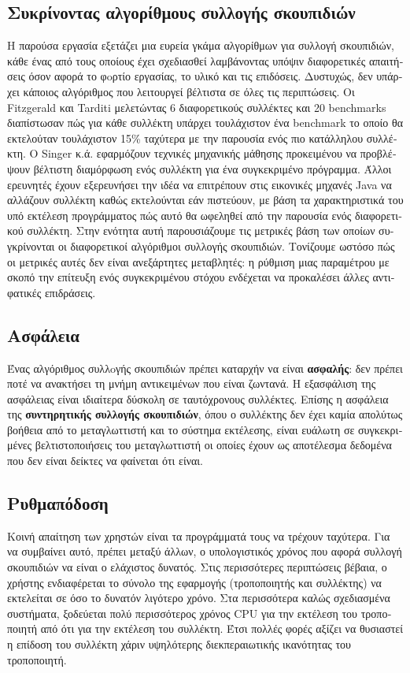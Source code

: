 \begin{greek}
\section{Συκρίνοντας αλγορίθμους συλλογής σκουπιδιών}
Η παρούσα εργασία εξετάζει μια ευρεία γκάμα αλγορίθμων για συλλογή
σκουπιδιών, κάθε ένας από τους οποίους έχει σχεδιασθεί λαμβάνοντας
υπόψιν διαφορετικές απαιτήσεις όσον αφορά το φoρτίο εργασίας,
το υλικό και τις επιδόσεις. Δυστυχώς, δεν υπάρχει κάποιος αλγόριθμος
που λειτουργεί βέλτιστα σε όλες τις περιπτώσεις. Οι Fitzgerald
και Tarditi \cite{DBLP:conf/iwmm/FitzgeraldT00} μελετώντας 6 
διαφορετικούς συλλέκτες και 20 benchmarks διαπίστωσαν πώς για
κάθε συλλέκτη υπάρχει τουλάχιστον ένα benchmark το οποίο θα εκτελούταν
τουλάχιστον 15\% ταχύτερα με την παρουσία ενός πιο κατάλληλου
συλλέκτη. Ο Singer κ.ά. \cite{DBLP:conf/iwmm/SingerBWC07} εφαρμόζουν
τεχνικές μηχανικής μάθησης προκειμένου να προβλέψουν βέλτιστη
διαμόρφωση ενός συλλέκτη για ένα συγκεκριμένο πρόγραμμα. Άλλοι
ερευνητές \cite{DBLP:conf/jvm/Printezis01,DBLP:conf/iwmm/SomanKB04}
έχουν εξερευνήσει την ιδέα να επιτρέπουν στις εικονικές μηχανές
Java να αλλάζουν συλλέκτη καθώς εκτελούνται εάν πιστεύουν, με
βάση τα χαρακτηριστικά του υπό εκτέλεση προγράμματος πώς αυτό
θα ωφεληθεί από την παρουσία ενός διαφορετικού συλλέκτη. Στην
ενότητα αυτή παρουσιάζουμε τις μετρικές βάση των οποίων συγκρίνονται
οι διαφορετικοί αλγόριθμοι συλλογής σκουπιδιών. Τονίζουμε ωστόσο
πώς οι μετρικές αυτές δεν είναι ανεξάρτητες μεταβλητές: η ρύθμιση
μιας παραμέτρου με σκοπό την επίτευξη ενός συγκεκριμένου στόχου
ενδέχεται να προκαλέσει άλλες αντιφατικές επιδράσεις.

\subsection{Ασφάλεια}
Ένας αλγόριθμος συλλoγής σκουπιδιών πρέπει καταρχήν να είναι
\textbf{ασφαλής}: δεν πρέπει ποτέ να ανακτήσει τη μνήμη αντικειμένων
που είναι ζωντανά. Η εξασφάλιση της ασφάλειας είναι ιδιαίτερα
δύσκολη σε ταυτόχρονους συλλέκτες. Επίσης η ασφάλεια της
\textbf{συντηρητικής συλλογής σκουπιδιών}, όπου ο συλλέκτης δεν
έχει καμία απολύτως βοήθεια από το μεταγλωττιστή και το σύστημα
εκτέλεσης, είναι ευάλωτη σε συγκεκριμένες βελτιστοποιήσεις του
μεταγλωττιστή οι οποίες έχουν ως αποτέλεσμα δεδομένα που
δεν είναι δείκτες να φαίνεται ότι είναι.

\subsection{Ρυθμαπόδοση}
Κοινή απαίτηση των χρηστών είναι τα προγράμματά τους να τρέχουν
ταχύτερα. Για να συμβαίνει αυτό, πρέπει μεταξύ άλλων, ο υπολογιστικός
χρόνος που αφορά συλλογή σκουπιδιών να είναι ο ελάχιστος δυνατός.
Στις περισσότερες περιπτώσεις βέβαια, ο χρήστης ενδιαφέρεται το
σύνολο της εφαρμογής (τροποποιητής και συλλέκτης) να εκτελείται
σε όσο το δυνατόν λιγότερο χρόνο. Στα περισσότερα καλώς σχεδιασμένα
συστήματα, ξοδεύεται πολύ περισσότερος χρόνος CPU για την εκτέλεση
του τροποποιητή από ότι για την εκτέλεση του συλλέκτη. Έτσι πολλές
φορές αξίζει να θυσιαστεί η επίδοση του συλλέκτη χάριν υψηλότερης 
διεκπεραιωτικής ικανότητας του τροποποιητή.


\end{greek}
